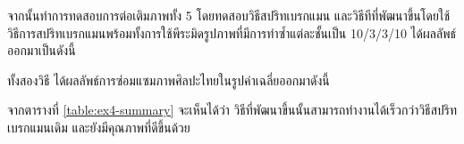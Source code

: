


\vspace{1cm}

\hspace{1cm} จากนั้นทำการทดสอบการต่อเติมภาพทั้ง 5 โดยทดสอบวิธีสปริทเบรกแมน และวิธีทีที่พัฒนาขึ้นโดยใช้วิธีการสปริทเบรกแมนพร้อมทั้งการใช้พีระมิดรูปภาพที่มีการทำซ้ำแต่ละชั้นเป็น 10/3/3/10  ได้ผลลัพธ์ออกมาเป็นดังนี้







\hspace{1cm}ทั้งสองวิธี ได้ผลลัพธ์การซ่อมแซมภาพศิลปะไทยในรูปค่าเฉลี่ยออกมาดังนี้



\hspace{1cm} จากตารางที่ \ref{table:ex4-summary} จะเห็นได้ว่า วิธีที่พัฒนาขึ้นนั้นสามารถทำงานได้เร็วกว่าวิธีสปริทเบรกแมนเดิม และยังมีคุณภาพที่ดีขึ้นด้วย

